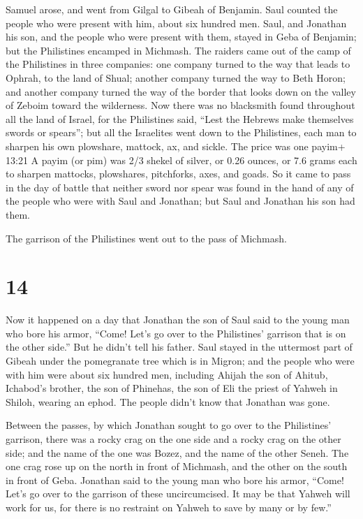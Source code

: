  Samuel arose, and went from Gilgal to Gibeah of Benjamin.
Saul counted the people who were present with him, about six hundred
men.  Saul, and Jonathan his son, and the people who were
present with them, stayed in Geba of Benjamin; but the Philistines
encamped in Michmash.  The raiders came out of the camp of
the Philistines in three companies: one company turned to the way that
leads to Ophrah, to the land of Shual;  another company
turned the way to Beth Horon; and another company turned the way of the
border that looks down on the valley of Zeboim toward the wilderness.
 Now there was no blacksmith found throughout all the land
of Israel, for the Philistines said, ``Lest the Hebrews make themselves
swords or spears'';  but all the Israelites went down to
the Philistines, each man to sharpen his own plowshare, mattock, ax, and
sickle.  The price was one payim+ 13:21 A payim (or pim)
was 2/3 shekel of silver, or 0.26 ounces, or 7.6 grams each to sharpen
mattocks, plowshares, pitchforks, axes, and goads.  So it
came to pass in the day of battle that neither sword nor spear was found
in the hand of any of the people who were with Saul and Jonathan; but
Saul and Jonathan his son had them.

 The garrison of the Philistines went out to the pass of
Michmash.

\hypertarget{section-13}{%
\section{14}\label{section-13}}

 Now it happened on a day that Jonathan the son of Saul said
to the young man who bore his armor, ``Come! Let's go over to the
Philistines' garrison that is on the other side.'' But he didn't tell
his father.  Saul stayed in the uttermost part of Gibeah
under the pomegranate tree which is in Migron; and the people who were
with him were about six hundred men,  including Ahijah the
son of Ahitub, Ichabod's brother, the son of Phinehas, the son of Eli
the priest of Yahweh in Shiloh, wearing an ephod. The people didn't know
that Jonathan was gone.

 Between the passes, by which Jonathan sought to go over to
the Philistines' garrison, there was a rocky crag on the one side and a
rocky crag on the other side; and the name of the one was Bozez, and the
name of the other Seneh.  The one crag rose up on the north
in front of Michmash, and the other on the south in front of Geba.
 Jonathan said to the young man who bore his armor, ``Come!
Let's go over to the garrison of these uncircumcised. It may be that
Yahweh will work for us, for there is no restraint on Yahweh to save by
many or by few.''

